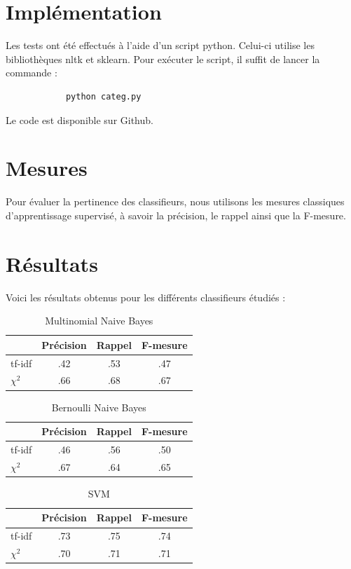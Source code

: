 \documentclass[a4paper,12pt]{article}
\begin{document}
	\section*{Implémentation}
		Les tests ont été effectués à l'aide d'un script python. Celui-ci utilise les bibliothèques nltk et sklearn. Pour exécuter le script, il suffit de lancer la commande :
		\begin{verbatim}
			python categ.py
		\end{verbatim}
		Le code est disponible sur Github.

	\section*{Mesures}
		Pour évaluer la pertinence des classifieurs, nous utilisons les mesures classiques d'apprentissage supervisé, à savoir la précision, le rappel ainsi que la F-mesure.

	\section*{Résultats}
		Voici les résultats obtenus pour les différents classifieurs étudiés :

		\begin{table}[h!]
			\centering
			\begin{tabular}{l|c c c}
				& Précision & Rappel & F-mesure\\
				\hline
				tf-idf & .42 & .53 & .47\\
				$\chi^2$ & .66 & .68 & .67\\
			\end{tabular}
			\caption{Multinomial Naive Bayes}
		\end{table}

		\begin{table}[h!]
			\centering
			\begin{tabular}{l|c c c}
				& Précision & Rappel & F-mesure\\
				\hline
				tf-idf & .46 & .56 & .50\\
				$\chi^2$ & .67 & .64 & .65\\
			\end{tabular}
			\caption{Bernoulli Naive Bayes}
		\end{table}

		\begin{table}[h!]
			\centering
			\begin{tabular}{l|c c c}
				& Précision & Rappel & F-mesure\\
				\hline
				tf-idf & .73 & .75 & .74\\
				$\chi^2$ & .70 & .71 & .71\\
			\end{tabular}
			\caption{SVM}
		\end{table}
\end{document}
